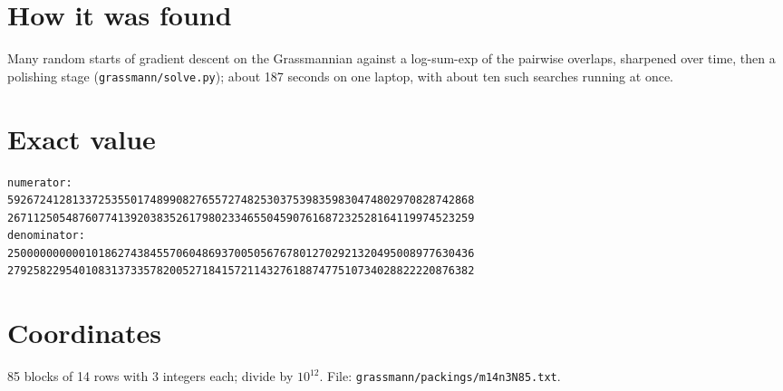 \documentclass[11pt,a4paper]{article}
\begin{document}
\section{How it was found}
Many random starts of gradient descent on the Grassmannian against a log-sum-exp of the pairwise overlaps, sharpened over time, then a polishing stage (\texttt{grassmann/solve.py}); about 187 seconds on one laptop, with about ten such searches running at once.


\appendix
\section{Exact value}
{\small
\begin{verbatim}
numerator:
592672412813372535501748990827655727482530375398359830474802970828742868
267112505487607741392038352617980233465504590761687232528164119974523259
denominator:
250000000000101862743845570604869370050567678012702921320495008977630436
279258229540108313733578200527184157211432761887477510734028822220876382
\end{verbatim}}

\section{Coordinates}
85 blocks of 14 rows with 3 integers each; divide by $10^{12}$. File: \texttt{grassmann/packings/m14n3N85.txt}.
{\tiny
\begin{multicols}{3}
\end{multicols}}
\end{document}
